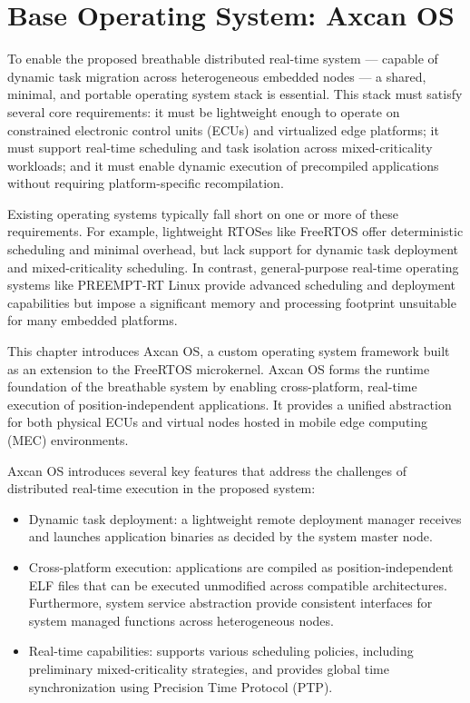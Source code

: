 
\chapter{Base Operating System: Axcan OS}\label{chap:os}

To enable the proposed breathable distributed real-time system — capable of dynamic task migration across heterogeneous embedded nodes — a shared, minimal, and portable operating system stack is essential. This stack must satisfy several core requirements: it must be lightweight enough to operate on constrained electronic control units (ECUs) and virtualized edge platforms; it must support real-time scheduling and task isolation across mixed-criticality workloads; and it must enable dynamic execution of precompiled applications without requiring platform-specific recompilation.

Existing operating systems typically fall short on one or more of these requirements. For example, lightweight RTOSes like FreeRTOS offer deterministic scheduling and minimal overhead, but lack support for dynamic task deployment and mixed-criticality scheduling. In contrast, general-purpose real-time operating systems like PREEMPT-RT Linux provide advanced scheduling and deployment capabilities but impose a significant memory and processing footprint unsuitable for many embedded platforms.

This chapter introduces Axcan OS, a custom operating system framework built as an extension to the FreeRTOS microkernel. Axcan OS forms the runtime foundation of the breathable system by enabling cross-platform, real-time execution of position-independent applications. It provides a unified abstraction for both physical ECUs and virtual nodes hosted in mobile edge computing (MEC) environments.

Axcan OS introduces several key features that address the challenges of distributed real-time execution in the proposed system:

\begin{itemize}
	\item Dynamic task deployment: a lightweight remote deployment manager receives and launches application binaries as decided by the system master node.
	
	\item Cross-platform execution: applications are compiled as position-independent ELF files that can be executed unmodified across compatible architectures. Furthermore,  system service abstraction provide consistent interfaces for system managed functions across heterogeneous nodes.
	
	\item Real-time capabilities: supports various scheduling policies, including preliminary mixed-criticality strategies, and provides global time synchronization using Precision Time Protocol (PTP).
\end{itemize}

